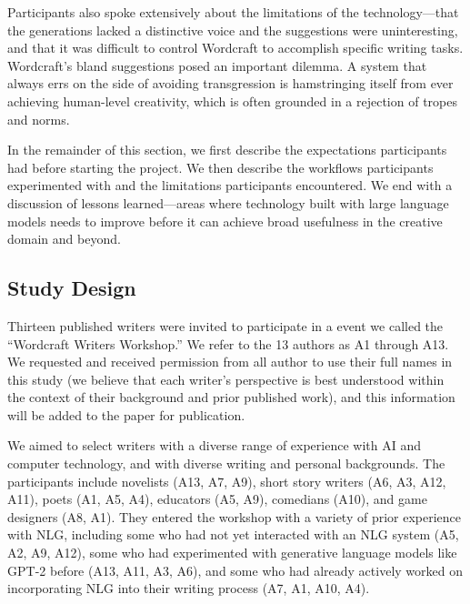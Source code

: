 
Participants also spoke extensively about the limitations of the technology---that the generations lacked a distinctive voice and the suggestions were uninteresting, and that it was difficult to control Wordcraft to accomplish specific writing tasks.
Wordcraft's bland suggestions posed an important dilemma.
A system that always errs on the side of avoiding transgression is hamstringing itself from ever achieving human-level creativity, which is often grounded in a rejection of tropes and norms.

In the remainder of this section, we first describe the expectations participants had before starting the project.
We then describe the workflows participants experimented with and the limitations participants encountered.
We end with a discussion of lessons learned---areas where technology built with large language models needs to improve before it can achieve broad usefulness in the creative domain and beyond.



% 

\subsection{Study Design}
Thirteen published writers were invited to participate in a event we called the ``Wordcraft Writers Workshop.''
We refer to the 13 authors as A1 through A13.
We requested and received permission from all author to use their full names in this study (we believe that each writer's perspective is best understood within the context of their background and prior published work), and this information will be added to the paper for publication.


We aimed to select writers with a diverse range of experience with AI and computer technology, and with diverse writing and personal backgrounds.
The participants include novelists (A13, A7, A9), short story writers (A6, A3, A12, A11), poets (A1, A5, A4), educators (A5, A9), comedians (A10), and game designers (A8, A1).
They entered the workshop with a variety of prior experience with NLG, including some who had not yet interacted with an NLG system (A5, A2, A9, A12), some who had experimented with generative language models like GPT-2 before (A13, A11, A3, A6), and some who had already actively worked on incorporating NLG into their writing process (A7, A1, A10, A4).

